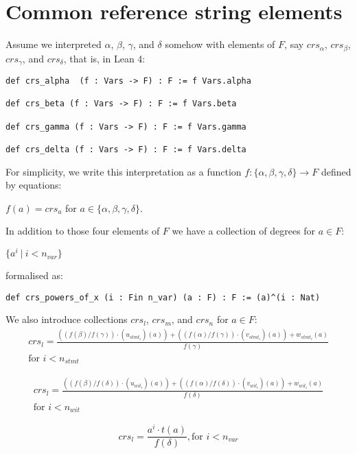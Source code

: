 \documentclass{article}
\theoremstyle{definition}
\theoremstyle{remark}
\begin{document}
\section{Common reference string elements}

Assume we interpreted $\alpha$, $\beta$, $\gamma$, and $\delta$ somehow with elements of $F$, say $crs_{\alpha}$, $crs_{\beta}$, $crs_{\gamma}$, and $crs_{\delta}$, that is, in Lean 4:

\begin{lstlisting}
def crs_alpha  (f : Vars -> F) : F := f Vars.alpha

def crs_beta (f : Vars -> F) : F := f Vars.beta

def crs_gamma (f : Vars -> F) : F := f Vars.gamma

def crs_delta (f : Vars -> F) : F := f Vars.delta
\end{lstlisting}

For simplicity, we write this interpretation as a function $f :  \{ \alpha,\beta,\gamma, \delta \} \to F$ defined by equations:
\begin{center}
$f(a) = crs_{a}$ for $a \in \{ \alpha,\beta,\gamma, \delta \}$.
\end{center}

In addition to those four elements of $F$ we have a collection of degrees for $a \in F$:
\begin{center}
$\{ a^i \: | \: i < n_{var} \}$
\end{center}
formalised as:
\begin{lstlisting}
def crs_powers_of_x (i : Fin n_var) (a : F) : F := (a)^(i : Nat)
\end{lstlisting}

We also introduce collections $crs_l$, $crs_m$, and $crs_n$ for $a \in F$:
\begin{multline}
crs_l = \frac{((f(\beta) / f(\gamma)) \cdot (u_{{stmt}_i})(a)) + ((f(\alpha) / f(\gamma)) \cdot (v_{{stmt}_i})(a)) + w_{{stmt}_i}(a)}{f(\gamma)} \\ \text{for $i < n_{stmt}$}
\end{multline}

\begin{multline}
crs_l = \frac{((f(\beta) / f(\delta)) \cdot (u_{{wit}_i})(a)) + ((f(\alpha) / f(\delta)) \cdot (v_{{wit}_i})(a)) + w_{{wit}_i}(a)}{f(\delta)} \\ \text{for $i < n_{wit}$}
\end{multline}

\begin{equation}
crs_l = \frac{a^i \cdot t(a)}{f(\delta)}, \text{for $i < n_{var}$}
\end{equation}
\end{document}
